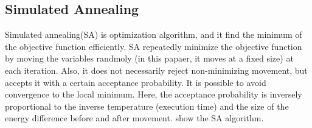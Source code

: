 \documentclass[fp,twocolumn]{jpsj3}
\begin{document}
\subsection{Simulated Annealing} %
Simulated annealing(SA) is optimization algorithm, and it find the minimum of the objective function efficiently. SA repeatedly minimize the objective function by moving the variables randmoly (in this papaer, it moves at a fixed size) at each iteration. Also, it does not necessarily reject non-minimizing movement, but accepts it with a certain acceptance probability. It is possible to avoid convergence to the local minimum. Here, the acceptance probability is inversely proportional to the inverse temperature (execution time) and the size of the energy difference before and after movement. \cite{} show the SA algorithm.
\end{document}
